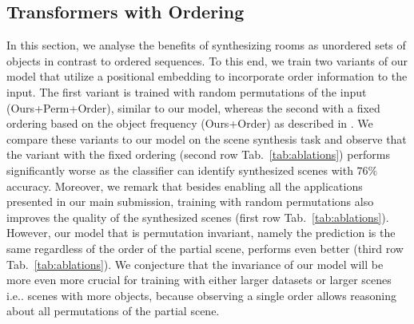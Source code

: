 \documentclass{article}
\makeatletter
\DeclareRobustCommand\onedot{\futurelet\@let@token\@onedot}
\def\@onedot{\ifx\@let@token.\else.\null\fi\xspace}
\def\ie{i.e\onedot} \def\Ie{I.e\onedot}
\def\wrt{wrt\onedot}
\newcommand{\tabref}[1]{Tab.~\ref{#1}}
\makeatother
\begin{document}
\subsection{Transformers with Ordering}
\label{subsec:ordered_transformers}
\begin{table}
    \centering
    \vspace{0.6em}
    \caption{{\bf Ablation Study on Ordering.} This table shows a quantitative
    comparison of our approach \wrt two variants of our model that represent rooms as
    ordered sequence of objects.}
    \label{tab:ablations}
\end{table}


In this section, we analyse the benefits of synthesizing rooms as unordered
sets of objects in contrast to ordered sequences. To this end, we train two
variants of our model that utilize a positional embedding
\cite{Vaswani2017NIPS} to incorporate order information to the input. The first
variant is trained with random permutations of the input (Ours+Perm+Order),
similar to our model,  whereas the second with a fixed ordering based on the
object frequency (Ours+Order) as described in \cite{Ritchie2019CVPR,
Wang2020ARXIV}. We compare these variants to our model on the scene synthesis
task and observe that the variant with the fixed ordering
(second row \tabref{tab:ablations}) performs significantly worse as the classifier can identify
synthesized scenes with $76\%$ accuracy. Moreover, we remark that besides enabling all
the applications presented in our main submission, training with random
permutations also improves the quality of the synthesized scenes (first row
\tabref{tab:ablations}). However, our model that is permutation
invariant, namely the prediction is the same regardless of the order of the
partial scene, performs even better (third row \tabref{tab:ablations}). We
conjecture that the invariance of our model will be more even more crucial for
training with either larger datasets or larger scenes \ie scenes with more
objects, because observing a single order allows reasoning about all
permutations of the partial scene.
\end{document}
